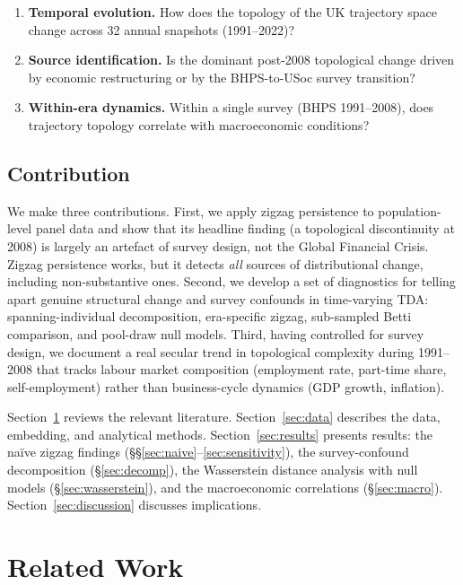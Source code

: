 \begin{enumerate}
  \item \textbf{Temporal evolution.} How does the topology of the UK trajectory
    space change across 32 annual snapshots (1991--2022)?
  \item \textbf{Source identification.} Is the dominant post-2008 topological
    change driven by economic restructuring or by the BHPS-to-USoc survey
    transition?
  \item \textbf{Within-era dynamics.} Within a single survey (BHPS 1991--2008),
    does trajectory topology correlate with macroeconomic conditions?
\end{enumerate}

\subsection{Contribution}

We make three contributions.
First, we apply zigzag persistence to population-level panel data and show that
its headline finding (a topological discontinuity at 2008) is largely an artefact
of survey design, not the Global Financial Crisis.
Zigzag persistence works, but it detects \emph{all} sources of distributional
change, including non-substantive ones.
Second, we develop a set of diagnostics for telling apart genuine structural
change and survey confounds in time-varying TDA: spanning-individual
decomposition, era-specific zigzag, sub-sampled Betti comparison, and pool-draw
null models.
Third, having controlled for survey design, we document a real secular trend in
topological complexity during 1991--2008 that tracks labour market composition
(employment rate, part-time share, self-employment) rather than business-cycle
dynamics (GDP growth, inflation).

Section~\ref{sec:lit} reviews the relevant literature.
Section~\ref{sec:data} describes the data, embedding, and analytical methods.
Section~\ref{sec:results} presents results: the na\"ive zigzag findings
(\S\S\ref{sec:naive}--\ref{sec:sensitivity}), the survey-confound decomposition
(\S\ref{sec:decomp}), the Wasserstein distance analysis with null models
(\S\ref{sec:wasserstein}), and the macroeconomic correlations
(\S\ref{sec:macro}).
Section~\ref{sec:discussion} discusses implications.

\section{Related Work}
\label{sec:lit}

